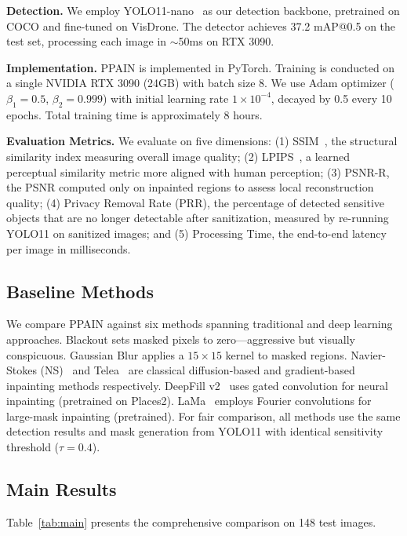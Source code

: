 \documentclass[preprint,12pt]{elsarticle}
\begin{document}
\textbf{Detection.} We employ YOLO11-nano~\cite{ultralytics2024yolo} as our detection backbone, pretrained on COCO and fine-tuned on VisDrone. The detector achieves 37.2 mAP@0.5 on the test set, processing each image in $\sim$50ms on RTX 3090.

\textbf{Implementation.} PPAIN is implemented in PyTorch. Training is conducted on a single NVIDIA RTX 3090 (24GB) with batch size 8. We use Adam optimizer ($\beta_1=0.5$, $\beta_2=0.999$) with initial learning rate $1 \times 10^{-4}$, decayed by 0.5 every 10 epochs. Total training time is approximately 8 hours.

\textbf{Evaluation Metrics.} We evaluate on five dimensions: (1) SSIM~\cite{wang2004image}, the structural similarity index measuring overall image quality; (2) LPIPS~\cite{zhang2018unreasonable}, a learned perceptual similarity metric more aligned with human perception; (3) PSNR-R, the PSNR computed only on inpainted regions to assess local reconstruction quality; (4) Privacy Removal Rate (PRR), the percentage of detected sensitive objects that are no longer detectable after sanitization, measured by re-running YOLO11 on sanitized images; and (5) Processing Time, the end-to-end latency per image in milliseconds.

\subsection{Baseline Methods}

We compare PPAIN against six methods spanning traditional and deep learning approaches. Blackout sets masked pixels to zero---aggressive but visually conspicuous. Gaussian Blur applies a $15 \times 15$ kernel to masked regions. Navier-Stokes (NS)~\cite{criminisi2004region} and Telea~\cite{telea2004imageinpainting} are classical diffusion-based and gradient-based inpainting methods respectively. DeepFill v2~\cite{yu2018free} uses gated convolution for neural inpainting (pretrained on Places2). LaMa~\cite{suvorov2022lama} employs Fourier convolutions for large-mask inpainting (pretrained). For fair comparison, all methods use the same detection results and mask generation from YOLO11 with identical sensitivity threshold ($\tau = 0.4$).

\subsection{Main Results}

Table~\ref{tab:main} presents the comprehensive comparison on 148 test images.
\end{document}
